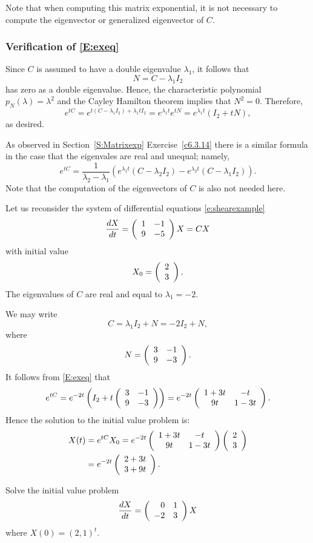 \documentclass{ximera}
\begin{document}
Note that when computing this matrix exponential, it is not necessary to 
compute the eigenvector or generalized eigenvector of $C$.  

\subsubsection*{Verification of \protect\eqref{E:exeq}}

Since $C$ is assumed to have a double eigenvalue $\lambda_1$, it follows that
\[
N = C - \lambda_1 I_2
\]
has zero as a double eigenvalue.  Hence, the characteristic polynomial
$p_N(\lambda) = \lambda^2$ and the Cayley Hamilton theorem implies that
$N^2=0$.  Therefore,
\[
e^{tC} = e^{t(C-\lambda_1 I_2)+\lambda_1 tI_2} =
e^{\lambda_1 t}e^{tN} = e^{\lambda_1 t}(I_2+tN),
\]
as desired.

As observed in Section~\ref{S:Matrixexp} Exercise~\ref{c6.3.14} there is a similar 
formula in the case that the eigenvales are real and unequal; namely,
\begin{equation}  \label{E:exdist2}
e^{tC} = \frac{1}{\lambda_2-\lambda_1}\left(e^{\lambda_1 t}(C-\lambda_2I_2) -
e^{\lambda_2 t}(C-\lambda_1I_2)\right).
\end{equation}
Note that the computation of the eigenvectors of $C$ is also not needed here.


Let us reconsider the system of differential equations \eqref{e:shearexample}
\[
\frac{dX}{dt} = \left(\begin{array}{rr} 1 & -1\\ 9 &-5\end{array}\right) X = CX
\]
with initial value
\[
X_0 = \left(\begin{array}{r} 2 \\ 3\end{array}\right).
\]
The eigenvalues of $C$ are real and equal to $\lambda_1=-2$.

We may write
\[
C = \lambda_1 I_2 + N = -2I_2+N,
\]
where
\[
N = \left(\begin{array}{rr} 3 & -1\\ 9 &-3\end{array}\right).
\]
It follows from \eqref{E:exeq} that
\begin{equation}  \label{e:solntob}
e^{tC} =  e^{-2t}\left(I_2+t\left(\begin{array}{rr} 3 & -1\\ 9 &-3\end{array}\right)\right)
= e^{-2t}\left(\begin{array}{cc} 1+3t & -t\\ 9t &1-3t\end{array}\right).
\end{equation}
Hence the solution to the initial value problem is:
\begin{align*}
X(t) &= e^{tC}X_0 = e^{-2t}\left(\begin{array}{cc} 1+3t & -t\\ 9t &1-3t\end{array}\right)\left(\begin{array}{r} 2 \\ 3\end{array}\right) \\
  &= e^{-2t}\left(\begin{array}{r} 2+3t \\ 3+9t\end{array}\right).
\end{align*}




\EXER

\TEXER

\begin{exercise} \label{c6.6.2}
Solve the initial value problem
\[
\frac{dX}{dt} = \left(\begin{array}{rr} 0 & 1\\ -2 &3\end{array}\right) X
\]
where $X(0)=(2,1)^t$.
\end{exercise}
\end{document}
